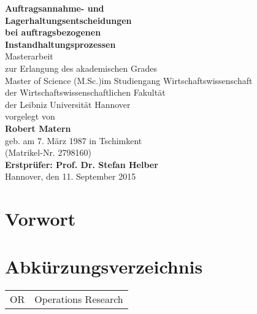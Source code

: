 \documentclass[a4paper,12pt,normalheadings,footexclude,headinclude,liststotoc,nochapterprefix,onecolumn,oneside,parskip,pointlessnumbers]{scrreprt}
\begin{document}

\begin{titlepage}
  \centering
  {\Huge{\bf Auftragsannahme- und}}\\[0.5cm]
    {\Huge{\bf Lagerhaltungsentscheidungen}}\\[0.5cm]
  {\Huge{\bf bei auftragsbezogenen}} \\[0.5cm]
    {\Huge{\bf Instandhaltungsprozessen}} \\[3cm]
  {\huge Masterarbeit} \\[1cm]
  {\Large zur Erlangung des akademischen Grades \\
  \glqq Master of Science (M.Sc.)\grqq\;im Studiengang Wirtschaftswissenschaft} \\[8mm]
  {\Large der Wirtschaftswissenschaftlichen Fakult\"{a}t \\
  der Leibniz Universit\"{a}t Hannover} \\[2cm]
  {\Large vorgelegt von} \\[8mm]
  {\Large\bf Robert Matern} \\[5mm]
  {\Large geb. am 7. März 1987 in Tschimkent } \\[2mm]
  {\Large (Matrikel-Nr. 2798160)} \\[2cm]
  {\Large\bf Erstpr\"{u}fer: Prof. Dr. Stefan Helber} \\[6mm]
  {\Large Hannover, den 11. September 2015}
\end{titlepage}
\newpage

\chapter*{Vorwort}


\tableofcontents

\chapter*{Abkürzungsverzeichnis}
\begin{table}[h!]
    \vspace*{-3mm}
    \hspace*{2mm}
  \renewcommand{\arraystretch}{1,5}
    \begin{tabular}{ll}  %
OR		    & Operations Research\\
	\end{tabular}
\end{table}
\end{document}
